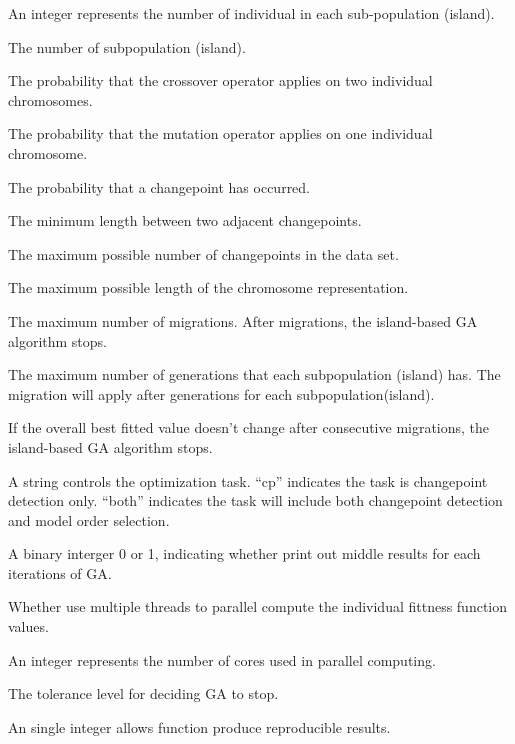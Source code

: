 \documentclass[a4paper]{book}
\begin{document}
\begin{Arguments}
\begin{ldescription}
\item[\code{subpopsize}] An integer represents the number of individual in each sub-population (island).
\item[\code{Islandsize}] The number of subpopulation (island).
\item[\code{Pcrossover}] The probability that the crossover operator applies on two individual chromosomes.
\item[\code{Pmutation}] The probability that the mutation operator applies on one individual chromosome.
\item[\code{Pchangepoint}] The probability that a changepoint has occurred.
\item[\code{minDist}] The minimum length between two adjacent changepoints.
\item[\code{mmax}] The maximum possible number of changepoints in the data set.
\item[\code{lmax}] The maximum possible length of the chromosome representation.
\item[\code{maxMig}] The maximum number of migrations. After  migrations, the island-based GA algorithm stops.
\item[\code{maxgen}] The maximum number of generations that each subpopulation (island) has. The migration will apply after  generations for each subpopulation(island).
\item[\code{maxconv}] If the overall best fitted value doesn't change after   consecutive migrations, the island-based GA algorithm stops.
\item[\code{option}] A string controls the optimization task. ``cp'' indicates the task is changepoint detection only. ``both'' indicates the task will include both changepoint detection and model order selection.
\item[\code{monitoring}] A binary interger 0 or 1, indicating whether print out middle results for each iterations of GA.
\item[\code{parallel}] Whether use multiple threads to parallel compute the individual fittness function values.
\item[\code{nCore}] An integer represents the number of cores used in parallel computing.
\item[\code{tol}] The tolerance level for deciding GA to stop.
\item[\code{seed}] An single integer allows function produce reproducible results.
\end{ldescription}
\end{Arguments}
\end{document}
